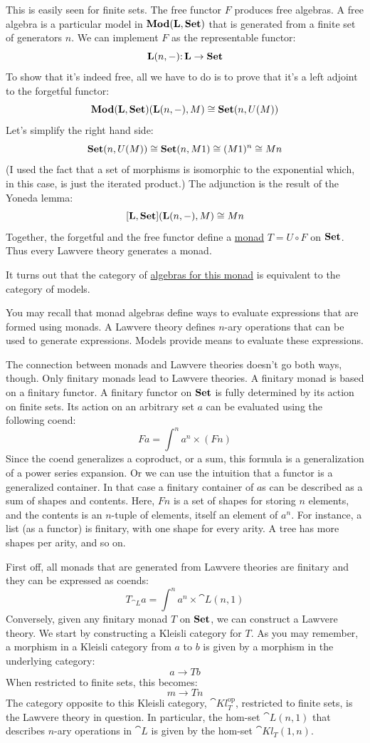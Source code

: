 This is easily seen for finite sets. The free functor $F$
produces free algebras. A free algebra is a particular model in
$\mathbf{Mod}(\mathbf{L}, \mathbf{Set})$ that is generated from a finite set of generators
$n$. We can implement $F$ as the representable functor:
\[\mathbf{L}(n, -) \mathpunct{:} \mathbf{L} \to \mathbf{Set}\]
To show that it's indeed free, all we have to do is to prove that it's a
left adjoint to the forgetful functor:
\[\mathbf{Mod}(\mathbf{L}, \mathbf{Set})(\mathbf{L}(n, -), M) \cong \mathbf{Set}(n, U(M))\]
Let's simplify the right hand side:
\[\mathbf{Set}(n, U(M)) \cong \mathbf{Set}(n, M 1) \cong (M 1)^n \cong M n\]
(I used the fact that a set of morphisms is isomorphic to the
exponential which, in this case, is just the iterated product.) The
adjunction is the result of the Yoneda lemma:
\[[\mathbf{L}, \mathbf{Set}](\mathbf{L}(n, -), M) \cong M n\]
Together, the forgetful and the free functor define a
\hyperref[monads-categorically]{monad}
$T = U \circ F$ on $\mathbf{Set}$. Thus every Lawvere theory generates
a monad.

It turns out that the category of
\hyperref[algebras-for-monads]{algebras
	for this monad} is equivalent to the category of models.

You may recall that monad algebras define ways to evaluate expressions
that are formed using monads. A Lawvere theory defines $n$-ary operations
that can be used to generate expressions. Models provide means to
evaluate these expressions.

The connection between monads and Lawvere theories doesn't go both ways,
though. Only finitary monads lead to Lawvere theories. A finitary monad
is based on a finitary functor. A finitary functor on $\mathbf{Set}$ is
fully determined by its action on finite sets. Its action on an
arbitrary set $a$ can be evaluated using the following coend:
\[F a = \int^n a^n \times (F n)\]
Since the coend generalizes a coproduct, or a sum, this formula is a
generalization of a power series expansion. Or we can use the intuition
that a functor is a generalized container. In that case a finitary
container of $a$s can be described as a sum of shapes and
contents. Here, $F n$ is a set of shapes for storing $n$ elements,
and the contents is an $n$-tuple of elements, itself an element of
$a^n$. For instance, a list (as a functor) is finitary, with one
shape for every arity. A tree has more shapes per arity, and so on.

First off, all monads that are generated from Lawvere theories are
finitary and they can be expressed as coends:
\[T_{\cat{L}} a = \int^n a^n \times \cat{L}(n, 1)\]
Conversely, given any finitary monad $T$ on $\mathbf{Set}$, we can
construct a Lawvere theory. We start by constructing a Kleisli category
for $T$. As you may remember, a morphism in a Kleisli category
from $a$ to $b$ is given by a morphism in the underlying
category:
\[a \to T b\]
When restricted to finite sets, this becomes:
\[m \to T n\]
The category opposite to this Kleisli category,
$\cat{Kl}^{\mathrm{op}}_{T}$, restricted to finite
sets, is the Lawvere theory in question. In particular, the hom-set
$\cat{L}(n, 1)$ that describes $n$-ary operations in $\cat{L}$ is given
by the hom-set $\cat{Kl}_{T}(1, n)$.

